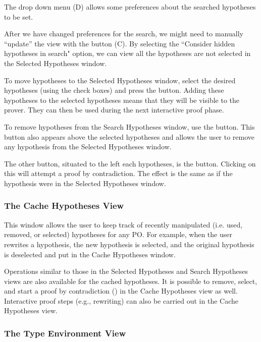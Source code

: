 The drop down menu (D) allows some preferences about the searched hypotheses to be set.

After we have changed preferences for the search, we might need to manually ``update'' the view with the button (C). By selecting the ``Consider hidden hypotheses in search" option, we can view all the hypotheses are not selected in the \textsf{Selected Hypotheses} window.

To move hypotheses to the \textsf{Selected Hypotheses} window, select the desired hypotheses (using the check boxes) and press the  button. Adding these hypotheses to the selected hypotheses means that they will be visible to the prover. They can then be used during the next interactive proof phase.

To remove hypotheses from the \textsf{Search Hypotheses} window, use the  button. This button also appears above the selected hypotheses and allows the user to remove any hypothesis from the \textsf{Selected Hypotheses} window.

The other button, situated to the left each hypotheses, is the  button. Clicking on this will attempt a proof by contradiction. The effect is the same as if the hypothesis were in the \textsf{Selected Hypotheses} window. 

\subsubsection{The Cache Hypotheses View}

This window allows the user to keep track of recently manipulated (i.e. used, removed, or selected) hypotheses for any PO. For example, when the user rewrites a hypothesis, the new hypothesis is selected, and the original hypothesis is deselected and put in the \textsf{Cache Hypotheses} window.

Operations similar to those in the \textsf{Selected Hypotheses} and \textsf{Search Hypotheses} views are also available for the cached hypotheses. It is possible to remove, select, and start a proof by contradiction () in the \textsf{Cache Hypotheses} view as well. Interactive proof steps (e.g., rewriting) can also be carried out in the \textsf{Cache Hypotheses} view.

\subsubsection{The Type Environment View}

